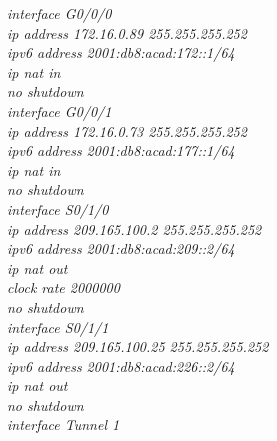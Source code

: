 \documentclass[12pt,a4paper]{report}
\begin{document}
\hspace*{2cm}\textit{interface G0/0/0\\
\hspace*{2cm}ip address 172.16.0.89 255.255.255.252\\
\hspace*{2cm}ipv6 address 2001:db8:acad:172::1/64\\
\hspace*{2cm}ip nat in\\
\hspace*{2cm}no shutdown\\
\hspace*{2cm}interface G0/0/1\\
\hspace*{2cm}ip address 172.16.0.73 255.255.255.252\\
\hspace*{2cm}ipv6 address 2001:db8:acad:177::1/64\\
\hspace*{2cm}ip nat in\\
\hspace*{2cm}no shutdown\\
\hspace*{2cm}interface S0/1/0\\
\hspace*{2cm}ip address 209.165.100.2 255.255.255.252\\
\hspace*{2cm}ipv6 address 2001:db8:acad:209::2/64\\
\hspace*{2cm}ip nat out\\
\hspace*{2cm}clock rate 2000000 \\
\hspace*{2cm}no shutdown\\
\hspace*{2cm}interface S0/1/1\\
\hspace*{2cm}ip address 209.165.100.25 255.255.255.252\\
\hspace*{2cm}ipv6 address 2001:db8:acad:226::2/64\\
\hspace*{2cm}ip nat out\\
\hspace*{2cm}no shutdown\\
\hspace*{2cm}interface Tunnel 1\\
}
\end{document}
